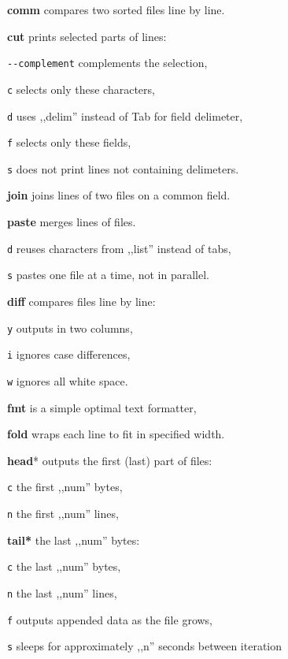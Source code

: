 \begin{enumx}
	\item [\cmd] \textbf{comm} compares two sorted files line by line.
\end{enumx}

\begin{enumx}
	\item [\cmdblack] \textbf{cut} prints selected parts of lines:
	\item [] \texttt{-}\texttt{-}\texttt{complement} complements the selection,
	\item [\texttt{c}] selects only these characters,
	\item [\texttt{d}] uses ,,delim'' instead of Tab for field delimeter,
	\item [\texttt{f}] selects only these fields,
	\item [\texttt{s}] does not print lines not containing delimeters.
	\item [\cmdblack] \textbf{join} joins lines of two files on a common field.
	\item [\cmdblack] \textbf{paste} merges lines of files.
	\item [\texttt{d}] reuses characters from ,,list'' instead of tabs,
	\item [\texttt{s}] pastes one file at a time, not in parallel.
\end{enumx}

\begin{enumx}
	\item [\cmd] \textbf{diff} compares files line by line:
	\item [\texttt{y}] outputs in two columns,
	\item [\texttt{i}] ignores case differences,
	\item [\texttt{w}] ignores all white space.
\end{enumx}

\begin{enumx}
	\item [\cmd] \textbf{fmt} is a simple optimal text formatter, 
	\item [\cmd] \textbf{fold} wraps each line to fit in specified width.
\end{enumx}

\begin{enumx}
	\item [\cmd] \textbf{head}* outputs the first (last) part of files:
	\item [\texttt{c}] the first ,,num'' bytes,
	\item [\texttt{n}] the first ,,num'' lines,
	\item [\cmd] \textbf{tail*} the last ,,num'' bytes:
	\item [\texttt{c}] the last ,,num'' bytes,
	\item [\texttt{n}] the last ,,num'' lines,
	\item [\texttt{f}] outputs appended data as the file grows,
	\item [\texttt{s}] sleeps for approximately ,,n'' seconds between iteration 
\end{enumx}


